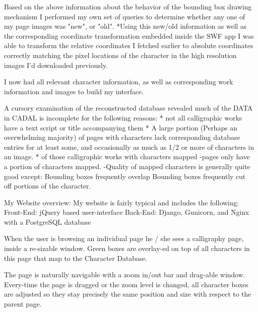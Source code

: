                 Based on the above information about the behavior of the bounding box drawing mechanism I performed my own set of queries to determine whether any one of my page images was "new", or "old".
                *Using this new/old information as well as the corresponding coordinate transformation embedded inside the SWF app I was able to transform the relative coordinates I fetched earlier to absolute coordinates correctly matching the pixel locations of the character in the high resolution images I'd downloaded previously.
                
                
                I now had all relevant character information, as well as corresponding work information and images to build my interface.
                
    A cursory examination of the reconstructed database revealed much of the DATA in CADAL is incomplete for the following reasons:
        * not all calligraphic works have a text script or title accompanying them
        * A large portion (Perhaps an overwhelming majority) of pages with characters lack corresponding database entries for at least some, and occasionally as much as 1/2 or more of characters in an image.
        * of those calligraphic works with characters mapped
            -pages only have a portion of characters mapped.
            -Quality of mapped characters is generally quite good except:
                Bounding boxes frequently overlap
                Bounding boxes frequently cut off portions of the character.                
                
        
        
        My Website overview:
            My website is fairly typical and includes the following:
                Front-End:  jQuery based user-interface
                Back-End:   Django, Gunicorn, and Nginx with a PostgreSQL database
                
            When the user is browsing an individual page he / she sees a calligraphy page, inside a re-sizable window.
                Green boxes are overlay-ed on top of all characters in this page that map to the Character Database.
                
                The page is naturally navigable with a zoom in/out bar and drag-able window.
                Every-time the page is dragged or the zoom level is changed, all character boxes are adjusted so they stay precisely the same position and size with respect to the parent page.
                

